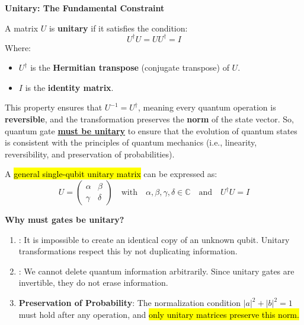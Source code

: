 \highspace
\begin{flushleft}
    \textcolor{Green3}{ \textbf{Unitary: The Fundamental Constraint}}
\end{flushleft}
A matrix $U$ is \textbf{unitary} if it satisfies the condition:
\begin{equation}
    U^{\dagger} U = U U^{\dagger} = I
\end{equation}
Where:
\begin{itemize}
    \item $U^{\dagger}$ is the \textbf{Hermitian transpose} (conjugate transpose) of $U$.
    \item $I$ is the \textbf{identity matrix}.
\end{itemize}
This property ensures that $U^{-1} = U^{\dagger}$, meaning every quantum operation is \textbf{reversible}, and the transformation preserves the \textbf{norm} of the state vector. So, quantum gate \textbf{\underline{must be unitary}} to ensure that the evolution of quantum states is consistent with the principles of quantum mechanics (i.e., linearity, reversibility, and preservation of probabilities).

\highspace
A \hl{general single-qubit unitary matrix} can be expressed as:
\begin{equation}
    U = \begin{pmatrix}
        \alpha & \beta \\
        \gamma & \delta
    \end{pmatrix}
    \quad \text{with} \quad \alpha, \beta, \gamma, \delta \in \mathbb{C} \quad \text{and} \quad U^{\dagger} U = I
\end{equation}

\highspace
\begin{flushleft}
    \textcolor{Red2}{ \textbf{Why must gates be unitary?}}
\end{flushleft}
\begin{enumerate}
    \item {}: It is impossible to create an identical copy of an unknown qubit. Unitary transformations respect this by not duplicating information.
    \item {}: We cannot delete quantum information arbitrarily. Since unitary gates are invertible, they do not erase information.
    \item \textbf{Preservation of Probability}: The normalization condition $\left|a\right|^{2} + \left|b\right|^{2} = 1$ must hold after any operation, and \hl{only unitary matrices preserve this norm.}
\end{enumerate}

